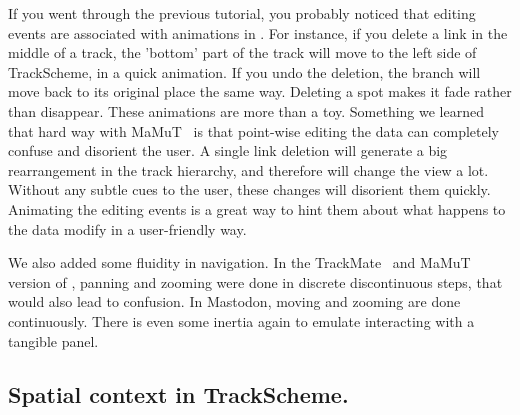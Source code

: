 If you went through the previous tutorial, you probably noticed that editing events are associated with animations in \TrackScheme.
For instance, if you delete a link in the middle of a track, the 'bottom' part of the track will move to the left side of TrackScheme, in a quick animation.
If you undo the deletion, the branch will move back to its original place the same way. 
Deleting a spot makes it fade rather than disappear.
These animations are more than a toy.
Something we learned that hard way with MaMuT~\cite{MaMuT} is that point-wise editing the data can completely confuse and disorient the user.
A single link deletion will generate a big rearrangement in the track hierarchy, and therefore will change the \TrackScheme view a lot. 
Without any subtle cues to the user, these changes will disorient them quickly.
Animating the editing events is a great way to hint them about what happens to the data modify in a user-friendly way.

We also added some fluidity in \TrackScheme navigation. 
In the TrackMate~\cite{TrackMate} and MaMuT~\cite{MaMuT} version of \TrackScheme, panning and zooming were done in discrete discontinuous steps, that would also lead to confusion.
In Mastodon, moving and zooming are done continuously. 
There is even some inertia again to emulate interacting with a tangible panel.



\subsection{Spatial context in TrackScheme.}